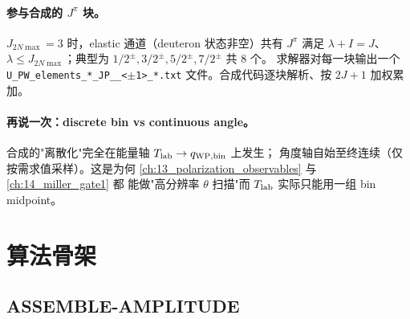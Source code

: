 \paragraph{参与合成的 \(J^\pi\) 块。}
\(J_{2N\max} = 3\) 时，elastic 通道（deuteron 状态非空）共有 \(J^\pi\) 满足
\(\lambda + I = J\)、\(\lambda \leq J_{2N\max}\)；典型为
\(1/2^\pm, 3/2^\pm, 5/2^\pm, 7/2^\pm\) 共 8 个。
求解器对每一块输出一个 \texttt{U\_PW\_elements\_*\_JP\_<2J>\_<\(\pm\)1>\_*.txt}
文件。合成代码逐块解析、按 \(2J+1\) 加权累加。

\paragraph{再说一次：discrete bin vs continuous angle。}
合成的"离散化"完全在能量轴 \({T_{\text{lab}}} \to q_{\rm WP, bin}\) 上发生；
角度轴自始至终连续（仅按需求值采样）。这是为何
\cref{ch:13_polarization_observables} 与 \cref{ch:14_miller_gate1} 都
能做"高分辨率 \(\theta\) 扫描"而 \({T_{\text{lab}}}\) 实际只能用一组 bin midpoint。

\section{算法骨架}
\label{sec:ch12-algorithm}

\subsection{ASSEMBLE-AMPLITUDE}
\label{subsec:ch12-alg-assemble}

